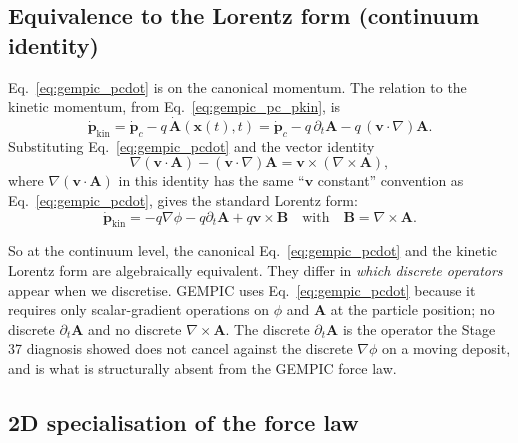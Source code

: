 \documentclass[11pt,a4paper]{article}
\newcommand{\vv}[1]{\mathbf{#1}}
\begin{document}
\subsection{Equivalence to the Lorentz form (continuum identity)}

Eq.~\eqref{eq:gempic_pcdot} is on the canonical momentum.  The
relation to the kinetic momentum, from
Eq.~\eqref{eq:gempic_pc_pkin}, is
\begin{equation}
\dot{\vv{p}}_{\mathrm{kin}}
   = \dot{\vv{p}}_c - q\,\dot{\vv{A}}(\vv{x}(t),t)
   = \dot{\vv{p}}_c - q\,\partial_t\vv{A}
                   - q\,(\vv{v}\cdot\nabla)\vv{A}.
\end{equation}
Substituting Eq.~\eqref{eq:gempic_pcdot} and the vector identity
\begin{equation}
\label{eq:vec_id}
\nabla(\vv{v}\cdot\vv{A}) - (\vv{v}\cdot\nabla)\vv{A}
   = \vv{v}\times(\nabla\times\vv{A}),
\end{equation}
where $\nabla(\vv{v}\cdot\vv{A})$ in this identity has the same
``$\vv{v}$ constant'' convention as
Eq.~\eqref{eq:gempic_pcdot}, gives the standard Lorentz form:
\begin{equation}
\dot{\vv{p}}_{\mathrm{kin}}
   = -q\nabla\phi - q\partial_t\vv{A} + q\vv{v}\times\vv{B}
   \quad\text{with}\quad
   \vv{B} = \nabla\times\vv{A}.
\end{equation}

So at the continuum level, the canonical
Eq.~\eqref{eq:gempic_pcdot} and the kinetic Lorentz form are
algebraically equivalent.  They differ in \emph{which discrete
operators} appear when we discretise.  GEMPIC uses
Eq.~\eqref{eq:gempic_pcdot} because it requires only scalar-gradient
operations on $\phi$ and $\vv{A}$ at the particle position; no
discrete $\partial_t\vv{A}$ and no discrete $\nabla\times\vv{A}$.
The discrete $\partial_t\vv{A}$ is the operator the Stage 37
diagnosis showed does not cancel against the discrete $\nabla\phi$
on a moving deposit, and is what is structurally absent from the
GEMPIC force law.

\subsection{2D specialisation of the force law}
\end{document}
